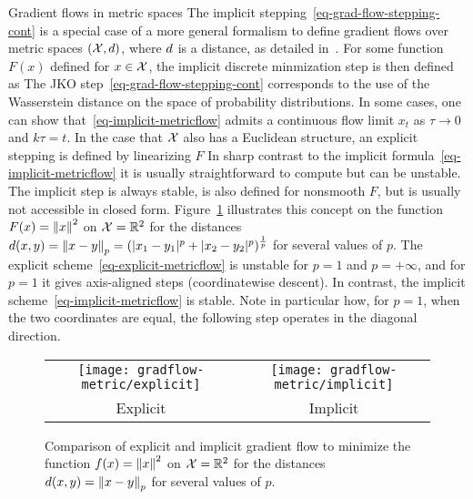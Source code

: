 \begin{rem2}{Gradient flows in metric spaces}
The implicit stepping~\eqref{eq-grad-flow-stepping-cont} is a special case of a more general formalism to define gradient flows over metric spaces $(\mathcal{X},d)$, where $d$ is a distance, as detailed in~\citep{ambrosio2006gradient}. 
%
For some function $F(x)$ defined for $x \in \mathcal{X}$, the implicit discrete minmization step is then defined as
The JKO step~\eqref{eq-grad-flow-stepping-cont} corresponds to the use of the Wasserstein distance on the space of probability distributions. In some cases, one can show that~\eqref{eq-implicit-metricflow} admits a continuous flow limit $x_t$ as $\tau \rightarrow 0$ and $k\tau=t$. 
%
In the case that $\mathcal{X}$ also has a Euclidean structure, an explicit stepping is defined by linearizing $F$
In sharp contrast to the implicit formula~\eqref{eq-implicit-metricflow} it is usually straightforward to compute but can be unstable. The implicit step is always stable, is also defined for nonsmooth $F$, but is usually not accessible in closed form.  
%
Figure~\ref{fig-gradflow-metric} illustrates this concept on the function $F(x) = \left\| x \right\|^2$ on $\mathcal{X}=\mathbb{R}^2$ for the distances $d(x,y)=\left\| x-y \right\|_p=(|x_1-y_1|^p+|x_2-y_2|^p)^{\frac{1}{p}}$ for several values of $p$. 
%
The explicit scheme~\eqref{eq-explicit-metricflow} is unstable for $p=1$ and $p=+\infty$, and for $p=1$ it gives axis-aligned steps (coordinatewise descent). 
%
In contrast, the implicit scheme~\eqref{eq-implicit-metricflow} is stable. Note in particular how, for $p=1$, when the two coordinates are equal, the following step operates in the diagonal direction. 
\end{rem2}


\begin{figure}[h!]
\centering
\begin{tabular}{cc}
\texttt{[image: gradflow-metric/explicit]}&
\texttt{[image: gradflow-metric/implicit]}\\
Explicit & Implicit
\end{tabular}
\caption{\label{fig-gradflow-metric}
Comparison of explicit and implicit gradient flow to minimize the function $f(x) = \left\| x \right\|^2$ on $\mathcal{X}=\mathbb{R}^2$ for the distances $d(x,y)=\left\| x-y \right\|_p$ for several values of $p$. 
}
\end{figure}


